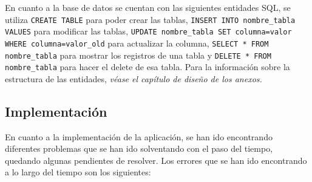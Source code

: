 En cuanto a la base de datos se cuentan con las siguientes entidades SQL, se
utiliza \texttt{CREATE TABLE} para poder crear las tablas, \texttt{INSERT INTO
nombre\_tabla VALUES} para modificar las tablas, \texttt{UPDATE nombre\_tabla SET
columna=valor WHERE columna=valor\_old} para actualizar la columna,
\texttt{SELECT * FROM nombre\_tabla} para mostrar los registros de una tabla y
\texttt{DELETE * FROM nombre\_tabla} para hacer el delete de esa tabla. Para la
información sobre la estructura de las entidades, \textit{véase el capítulo de
diseño de los anexos.}

 


\subsection{Implementación}
En cuanto a la implementación de la aplicación, se han ido encontrando
diferentes problemas que se han ido solventando con el paso del tiempo, quedando
algunas pendientes de resolver. Los errores que se han ido encontrando a lo
largo del tiempo son los siguientes:
